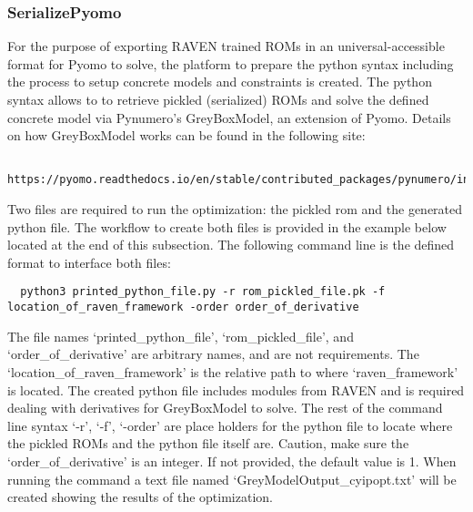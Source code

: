 





\subsubsection{SerializePyomo}
\label{subsubsec:serializepyomo}
For the purpose of exporting RAVEN trained ROMs in an universal-accessible format for Pyomo to solve, the platform to prepare
the python syntax including the process to setup concrete models and constraints is created. The python syntax allows to
to retrieve pickled (serialized) ROMs and solve the defined concrete model via Pynumero's GreyBoxModel, an extension of Pyomo.
Details on how GreyBoxModel works can be found in the following site:

\begin{lstlisting}
  https://pyomo.readthedocs.io/en/stable/contributed_packages/pynumero/index.html
\end{lstlisting}

Two files are required to run the optimization: the pickled rom and the generated python file. The workflow to create both files is
provided in the example below located at the end of this subsection. The following command line is the defined format to interface both files:

\begin{lstlisting}
  python3 printed_python_file.py -r rom_pickled_file.pk -f location_of_raven_framework -order order_of_derivative
\end{lstlisting}

The file names `printed\_python\_file', `rom\_pickled\_file', and `order\_of\_derivative' are arbitrary names, and are not requirements.
The `location\_of\_raven\_framework' is the relative path to where `raven\_framework' is located. The created python file includes modules from
RAVEN and is required dealing with derivatives for GreyBoxModel to solve. The rest of the command line syntax `-r', `-f', `-order' are place holders for
the python file to locate where the pickled ROMs and the python file itself are. Caution, make sure the `order\_of\_derivative' is an integer. If not provided,
the default value is 1. When running the command a text file named `GreyModelOutput\_cyipopt.txt' will be created showing the results of the optimization.

